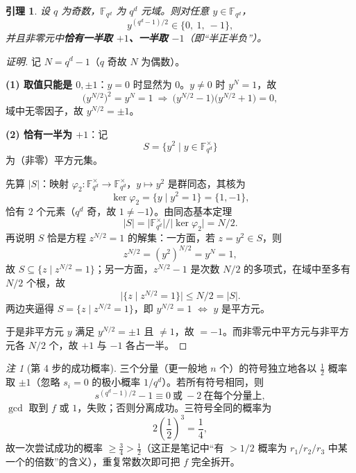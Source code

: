 \documentclass[11pt,a4paper]{ctexart}
\newtheorem*{lemma}{引理}
\theoremstyle{remark}
\newtheorem*{remark}{注}
\begin{document}
\begin{lemma}
设 $q$ 为奇数，$\mathbb{F}_{q^{d}}$ 为 $q^{d}$ 元域。则对任意 $y\in\mathbb{F}_{q^{d}}$，
\[
y^{(q^{d}-1)/2}\in\{0,\ 1,\ -1\},
\]
并且非零元中\textbf{恰有一半取 $+1$、一半取 $-1$}（即“半正半负”）。
\end{lemma}

\begin{proof}[证明]
记 $N=q^{d}-1$（$q$ 奇故 $N$ 为偶数）。

\textbf{(1) 取值只能是 $0,\pm1$}：$y=0$ 时显然为 $0$。$y\neq0$ 时 $y^{N}=1$，故
\[
\bigl(y^{N/2}\bigr)^{2}=y^{N}=1\ \Longrightarrow\ \bigl(y^{N/2}-1\bigr)\bigl(y^{N/2}+1\bigr)=0 ,
\]
域中无零因子，故 $y^{N/2}=\pm1$。

\textbf{(2) 恰有一半为 $+1$}：记
\[
S=\{y^{2}\mid y\in\mathbb{F}_{q^{d}}^{\times}\}
\]
为（非零）平方元集。

先算 $|S|$：映射 $\varphi_2:\mathbb{F}_{q^{d}}^{\times}\to\mathbb{F}_{q^{d}}^{\times}$，$y\mapsto y^{2}$ 是群同态，其核为
\[
\ker\varphi_2=\{y\mid y^{2}=1\}=\{1,-1\},
\]
恰有 $2$ 个元素（$q^{d}$ 奇，故 $1\neq-1$）。由同态基本定理
\[
|S|=\bigl|\mathbb{F}_{q^{d}}^{\times}\bigr|/\bigl|\ker\varphi_2\bigr|=N/2 .
\]
再说明 $S$ 恰是方程 $z^{N/2}=1$ 的解集：一方面，若 $z=y^{2}\in S$，则
\[
z^{N/2}=(y^{2})^{N/2}=y^{N}=1 ,
\]
故 $S\subseteq\{z\mid z^{N/2}=1\}$；另一方面，$z^{N/2}-1$ 是次数 $N/2$ 的多项式，在域中至多有 $N/2$ 个根，故
\[
\bigl|\{z\mid z^{N/2}=1\}\bigr|\le N/2=|S| .
\]
两边夹逼得 $S=\{z\mid z^{N/2}=1\}$，即 $y^{N/2}=1$ $\iff$ $y$ 是平方元。

于是非平方元 $y$ 满足 $y^{N/2}=\pm1$ 且 $\neq1$，故 $=-1$。而非零元中平方元与非平方元各 $N/2$ 个，故 $+1$ 与 $-1$ 各占一半。
\end{proof}

\begin{remark}[第 4 步的成功概率]
三个分量（更一般地 $n$ 个）的符号独立地各以 $\tfrac12$ 概率取 $\pm1$（忽略 $s_i=0$ 的极小概率 $1/q^{d}$）。若所有符号相同，则
\[
s^{(q^{d}-1)/2}-1\equiv 0\ \text{或}\ -2\ \text{在每个分量上},
\]
$\gcd$ 取到 $f$ 或 $1$，失败；否则分离成功。三符号全同的概率为
\[
2\left(\frac12\right)^{3}=\frac14 ,
\]
故一次尝试成功的概率 $\ge\tfrac34>\tfrac12$（这正是笔记中“有 $>1/2$ 概率为 $r_1/r_2/r_3$ 中某一个的倍数”的含义），重复常数次即可把 $f$ 完全拆开。
\end{remark}
\end{document}
